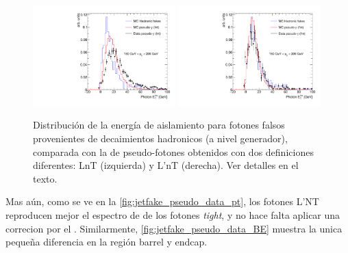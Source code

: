 \begin{figure}[!htbp]
  \centering

  \includegraphics[width=0.49\textwidth]{figures/bkg_mc_pseudo_data_SR_l_ptbin}
  \includegraphics[width=0.49\textwidth]{figures/bkg_mc_pseudo_data_SR_lp_ptbin}

  \caption{Distribución de la energía de aislamiento para fotones falsos
    provenientes de decaimientos hadronicos (a nivel generador), comparada con
    la de pseudo-fotones obtenidos con dos definiciones diferentes: LnT (izquierda) y L'nT (derecha). Ver detalles en el texto.}
  \label{fig:jetfake_mc_data}

\end{figure}

Mas aún, como se ve en la \cref{fig:jetfake_pseudo_data_pt}, los fotones L'NT
reproducen mejor el espectro de {\pt} de los fotones \emph{tight}, y no hace falta aplicar
una correcion por el {\pt}. Similarmente,
\cref{fig:jetfake_pseudo_data_BE} muestra la unica pequeña diferencia en la
región barrel y endcap.


